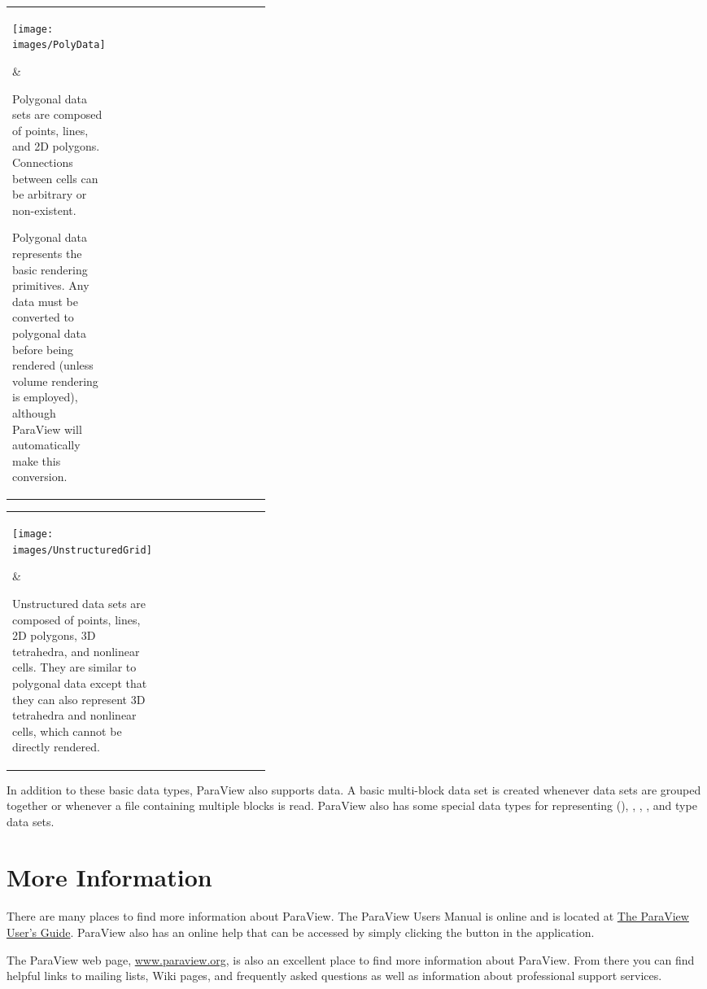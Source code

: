 \noindent
\begin{tabularx}{\linewidth}{p{0.37\linewidth}X}
  \parbox{\linewidth}{\texttt{[image: images/PolyData]}} &
  \begin{minipage}{\linewidth}

    Polygonal data sets are composed of points, lines, and 2D polygons.
    Connections between cells can be arbitrary or non-existent.
    
    Polygonal data represents the basic rendering primitives.  Any data
    must be converted to polygonal data before being rendered (unless
    volume rendering is employed), although ParaView will automatically
    make this conversion.
  \end{minipage}
\end{tabularx}

\noindent
\begin{tabularx}{\linewidth}{p{0.37\linewidth}X}
  \parbox{\linewidth}{\texttt{[image: images/UnstructuredGrid]}} &
  \begin{minipage}{\linewidth}

    Unstructured data sets are composed of points, lines, 2D polygons, 3D
    tetrahedra, and nonlinear cells.  They are similar to polygonal data
    except that they can also represent 3D tetrahedra and nonlinear cells,
    which cannot be directly rendered.
  \end{minipage}
\end{tabularx}

In addition to these basic data types, ParaView also supports
 data.  A basic multi-block data set is created
whenever data sets are grouped together or whenever a file containing
multiple blocks is read.  ParaView also has some special data types for
representing 
(), , ,
, and  type data sets.


\section{More Information}

There are many places to find more information about ParaView. The ParaView
Users Manual is online and is located at \href{http://paraview.org/Wiki/ParaView/Users_Guide/Table_Of_Contents}{The ParaView User's Guide}.  
ParaView also has an online help that can be accessed by simply clicking the  button in the application.  

The ParaView web page, \href{http://www.paraview.org}{www.paraview.org}, is
also an excellent place to find more information about ParaView.  From
there you can find helpful links to mailing lists, Wiki pages, and
frequently asked questions as well as information about professional
support services.



